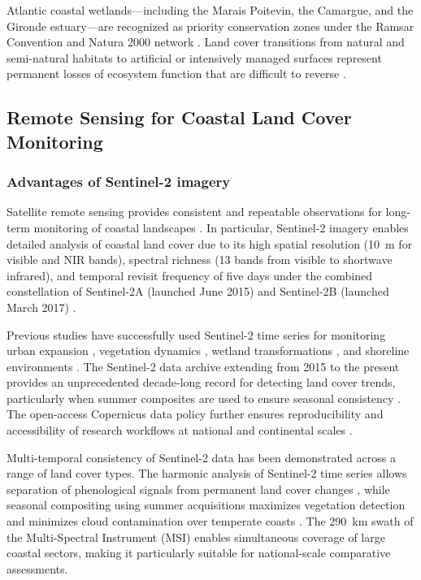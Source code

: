 \documentclass[remotesensing,article,submit,pdftex,moreauthors]{Definitions/mdpi}
\begin{document}
Atlantic coastal wetlands—including the Marais Poitevin, the Camargue, and the Gironde estuary—are recognized as priority conservation zones under the Ramsar Convention and Natura 2000 network \citep{barnaud2011zones,fustec2000zones,triplet2014camargue}. Land cover transitions from natural and semi-natural habitats to artificial or intensively managed surfaces represent permanent losses of ecosystem function that are difficult to reverse \citep{meur-ferec2007artificialisation,deboudt2010littoral}.

\subsection{Remote Sensing for Coastal Land Cover Monitoring}

\subsubsection{Advantages of Sentinel-2 imagery}

Satellite remote sensing provides consistent and repeatable observations for long-term monitoring of coastal landscapes \citep{Drusch2012}. In particular, Sentinel-2 imagery enables detailed analysis of coastal land cover due to its high spatial resolution (10~m for visible and NIR bands), spectral richness (13 bands from visible to shortwave infrared), and temporal revisit frequency of five days under the combined constellation of Sentinel-2A (launched June 2015) and Sentinel-2B (launched March 2017) \citep{MainKnornetal2017}.

Previous studies have successfully used Sentinel-2 time series for monitoring urban expansion \citep{pesaresi2016sentinel,soille2018urban}, vegetation dynamics \citep{Yancheng2024,BGDAG2024}, wetland transformations \citep{Cherian2024,Extraction2024}, and shoreline environments \citep{Review2025,castelle2021shoreline}. The Sentinel-2 data archive extending from 2015 to the present provides an unprecedented decade-long record for detecting land cover trends, particularly when summer composites are used to ensure seasonal consistency \citep{drusch2012sentinel,inglada2015}. The open-access Copernicus data policy further ensures reproducibility and accessibility of research workflows at national and continental scales \citep{aschbacher2012copernicus,EEA_CLC2018}.

Multi-temporal consistency of Sentinel-2 data has been demonstrated across a range of land cover types. The harmonic analysis of Sentinel-2 time series allows separation of phenological signals from permanent land cover changes \citep{jamet2019harmonic}, while seasonal compositing using summer acquisitions maximizes vegetation detection and minimizes cloud contamination over temperate coasts \citep{RF_Czechia2022,Lemenkova202401,inglada2017sits}. The 290~km swath of the Multi-Spectral Instrument (MSI) enables simultaneous coverage of large coastal sectors, making it particularly suitable for national-scale comparative assessments.
\end{document}
